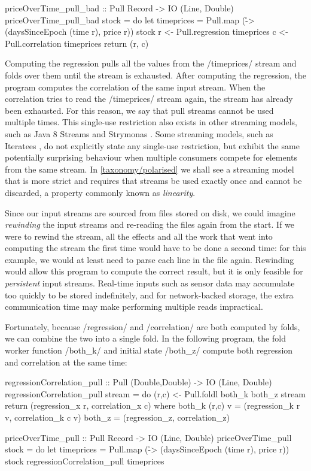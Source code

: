 \begin{haskell}
priceOverTime_pull_bad :: Pull Record -> IO (Line, Double)
priceOverTime_pull_bad stock = do
  let timeprices = Pull.map (\r -> (daysSinceEpoch (time r), price r)) stock
  r <- Pull.regression  timeprices
  c <- Pull.correlation timeprices
  return (r, c)
\end{haskell}

Computing the regression pulls all the values from the \Hs/timeprices/ stream and folds over them until the stream is exhausted.
After computing the regression, the program computes the correlation of the same input stream.
When the correlation tries to read the \Hs/timeprices/ stream again, the stream has already been exhausted.
For this reason, we say that pull streams cannot be used multiple times.
This single-use restriction also exists in other streaming models, such as Java 8 Streams \citep{reese2014java} and Strymonas \citep{biboudis2017expressive}.
Some streaming models, such as Iteratees \citep{kiselyov2012iteratees}, do not explicitly state any single-use restriction, but exhibit the same potentially surprising behaviour when multiple consumers compete for elements from the same stream.
In \cref{taxonomy/polarised} we shall see a streaming model that is more strict and requires that streams be used exactly once and cannot be discarded, a property commonly known as \emph{linearity}.

Since our input streams are sourced from files stored on disk, we could imagine \emph{rewinding} the input streams and re-reading the files again from the start.
If we were to rewind the stream, all the effects and all the work that went into computing the stream the first time would have to be done a second time: for this example, we would at least need to parse each line in the file again.
Rewinding would allow this program to compute the correct result, but it is only feasible for \emph{persistent} input streams.
Real-time inputs such as sensor data may accumulate too quickly to be stored indefinitely, and for network-backed storage, the extra communication time may make performing multiple reads impractical.

Fortunately, because \Hs/regression/ and \Hs/correlation/ are both computed by folds, we can combine the two into a single fold.
In the following program, the fold worker function \Hs/both_k/ and initial state \Hs/both_z/ compute both regression and correlation at the same time:

\begin{haskell}
regressionCorrelation_pull :: Pull (Double,Double) -> IO (Line, Double)
regressionCorrelation_pull stream = do
  (r,c) <- Pull.foldl both_k both_z stream
  return (regression_x r, correlation_x c)
 where
  both_k (r,c) v = (regression_k r v, correlation_k c v)
  both_z         = (regression_z,     correlation_z)

priceOverTime_pull :: Pull Record -> IO (Line, Double)
priceOverTime_pull stock = do
  let timeprices = Pull.map (\r -> (daysSinceEpoch (time r), price r)) stock
  regressionCorrelation_pull timeprices
\end{haskell}

